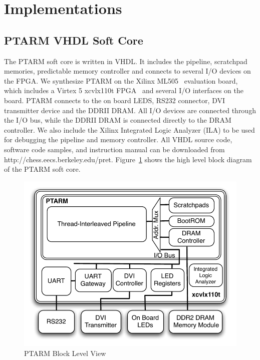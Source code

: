 \section{Implementations}
\subsection{PTARM VHDL Soft Core}
\label{sec:ptarm_vhdl_soft_core}
  
The PTARM soft core is written in VHDL.
It includes the pipeline, scratchpad memories, predictable memory controller and connects to several I/O devices on the FPGA.
We synthesize PTARM on the Xilinx ML505~\cite{xilinx-ml505} evaluation board, which includes a Virtex 5 xcvlx110t FPGA~\cite{xilinx-v5-overview} and several I/O interfaces on the board. 
PTARM connects to the on board LEDS, RS232 connector, DVI transmitter device and the DDRII DRAM.
All I/O devices are connected through the I/O bus, while the DDRII DRAM is connected directly to the DRAM controller.
We also include the Xilinx Integrated Logic Analyzer (ILA) to be used for debugging the pipeline and memory controller.
All VHDL source code, software code samples, and instruction manual can be downloaded from http://chess.eecs.berkeley.edu/pret.    
Figure~\ref{fig:ptarm_vhdl_high_level} shows the high level block diagram of the PTARM soft core.

\begin{figure}
  \vspace{-20pt}
  \begin{center}
    \includegraphics[scale=.6]{figs/ptarm_vhdl_high_level}
  \end{center}
  \vspace{-3mm}
  \caption{PTARM Block Level View}
  \label{fig:ptarm_vhdl_high_level}
  \vspace{-10pt}
\end{figure} 

